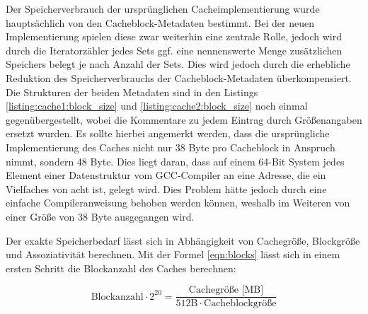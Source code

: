 Der Speicherverbrauch der ursprünglichen Cacheimplementierung wurde hauptsächlich von den Cacheblock-Metadaten bestimmt. Bei der neuen Implementierung spielen
diese zwar weiterhin eine zentrale Rolle, jedoch wird durch die Iteratorzähler jedes Sets ggf. eine nennenswerte Menge zusätzlichen Speichers belegt je nach
Anzahl der Sets. Dies wird jedoch durch die erhebliche Reduktion des Speicherverbrauchs der Cacheblock-Metadaten überkompensiert. Die Strukturen der beiden
Metadaten sind in den Listings \ref{listing:cache1:block_size} und \ref{listing:cache2:block_size} noch einmal gegenübergestellt, wobei die Kommentare zu jedem
Eintrag durch Größenangaben ersetzt wurden. Es sollte hierbei angemerkt werden, dass die ursprüngliche Implementierung des Caches nicht nur 38 Byte pro
Cacheblock in Anspruch nimmt, sondern 48 Byte. Dies liegt daran, dass auf einem 64-Bit System jedes Element einer Datenstruktur vom GCC-Compiler an eine Adresse,
die ein Vielfaches von acht ist, gelegt wird. Dies Problem hätte jedoch durch eine einfache Compileranweisung behoben werden können, weshalb im Weiteren von
einer Größe von 38 Byte ausgegangen wird.


\hfill
\begin{minipage}{.45\textwidth}

\end{minipage}
\hfill
\begin{minipage}{.45\textwidth}

\end{minipage}\hfill

Der exakte Speicherbedarf lässt sich in Abhängigkeit von Cachegröße, Blockgröße und Assoziativität berechnen. Mit der Formel \ref{eqn:blocks} lässt sich
in einem ersten Schritt die Blockanzahl des Caches berechnen:

\begin{equation}\label{eqn:blocks}
\text{Blockanzahl} \cdot 2^{20} = \frac{\displaystyle \text{Cachegröße [MB]}}{\displaystyle 512\text{B} \cdot \text{Cacheblockgröße}}
\end{equation}

